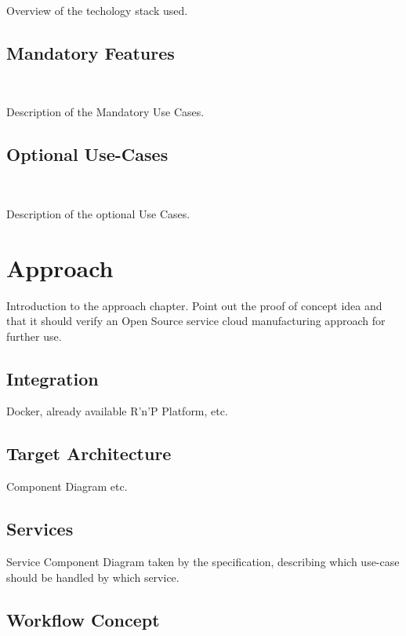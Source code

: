 \documentclass[
a4paper,
twoside,
bibliography=totoc,
headsepline,
cleardoublepage=empty,
parskip=half,
draft=false
]{scrbook}
\begin{document}
				Overview of the techology stack used.
			
				
			\subsection{Mandatory Features} \label{subsec:mandatory}
				
				Description of the Mandatory Use Cases.
				
			\subsection{Optional Use-Cases} \label{subsec:optional}	
				
				Description of the optional Use Cases.
				
		\section{Approach} \label{sec:approach}
		
			Introduction to the approach chapter. Point out the proof of concept idea and that it should verify an Open Source service cloud manufacturing approach for further use.
		
			\subsection{Integration} \label{subsec:integration}
			
				Docker, already available R'n'P Platform, etc.
				
			\subsection{Target Architecture} \label{subsec:target_architecture}
			
				Component Diagram etc.
			
			\subsection{Services} \label{subsec:services}
			
				Service Component Diagram taken by the specification, describing which use-case should be handled by which service.
				
			\subsection{Workflow Concept} \label{subsec:workflow_concept}
			
\end{document}
